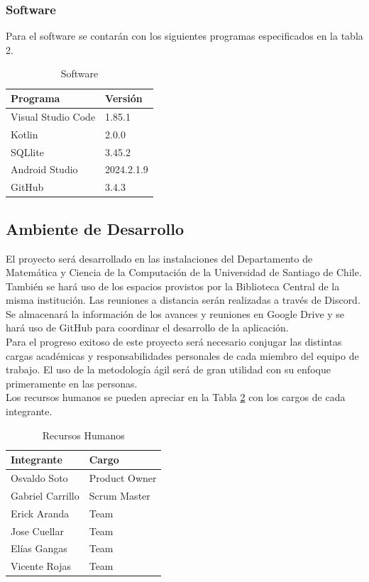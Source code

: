 \documentclass[letterpaper, 10pt]{article}
\begin{document}
\subsubsection{Software}
Para el software se contarán con los siguientes programas especificados en la tabla 2.
\begin{table}[H]
    \centering
    \caption{Software}
	\vspace{0.2cm}
    \begin{tabular}{|l|l|} \hline
        \textbf{Programa} & \textbf{Versión} \\ \hline
         Visual Studio Code & 1.85.1\\\hline
         Kotlin & 2.0.0 \\\hline
         SQLlite &  3.45.2\\\hline
         Android Studio &  2024.2.1.9\\\hline
         GitHub &  3.4.3 \\\hline
    \end{tabular}
    \label{table:2}
\end{table}

\subsection{Ambiente de Desarrollo}
El proyecto será desarrollado en las instalaciones del Departamento de Matemática y Ciencia de la Computación de la Universidad de Santiago de Chile. También se hará uso de los espacios provistos por la Biblioteca Central de la misma institución.
Las reuniones a distancia serán realizadas a través de Discord. Se almacenará la información de los avances y reuniones en Google Drive y se hará uso de GitHub para coordinar el desarrollo de la aplicación.\\
Para el progreso exitoso de este proyecto será necesario conjugar las distintas cargas académicas y responsabilidades personales de cada miembro del equipo de trabajo. El uso de la metodología ágil será de gran utilidad con su enfoque primeramente en las personas.\\
Los recursos humanos se pueden apreciar en la Tabla \ref{table:3} con los cargos de cada integrante.
\begin{table}[H]
    \centering
    \caption{Recursos Humanos}
	\vspace{0.2cm}
    \begin{tabular}{|l|l|} \hline
        \textbf{Integrante} & \textbf{Cargo}\\ \hline
		Osvaldo Soto & Product Owner\\\hline
		Gabriel Carrillo & Scrum Master\\\hline
		Erick Aranda & Team\\\hline
		Jose Cuellar & Team\\\hline
         Elías Gangas & Team\\\hline
         Vicente Rojas & Team\\\hline
    \end{tabular}
    
    \label{table:3}
\end{table}
\end{document}
